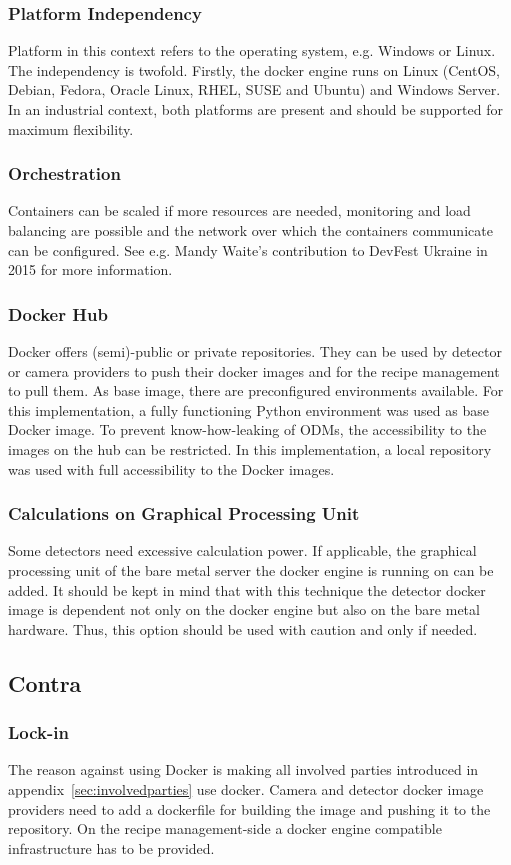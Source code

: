 \subsubsection{Platform Independency}
 Platform in this context refers to the operating system, e.g. Windows or Linux. The independency is twofold. Firstly, the docker engine runs on Linux (CentOS, Debian, Fedora, Oracle Linux, RHEL, SUSE and Ubuntu) and Windows Server. In an industrial context, both platforms are present and should be supported for maximum flexibility.
\subsubsection{Orchestration}
 Containers can be scaled if more resources are needed, monitoring and load balancing are possible and the network over which the containers communicate can be configured. See e.g. Mandy Waite's contribution to DevFest Ukraine in 2015 for more information.~\cite{Waite2015ScalableContainers}
\subsubsection{Docker Hub}
 Docker offers (semi)-public or private repositories. They can be used by detector or camera providers to push their docker images and for the recipe management to pull them. As base image, there are preconfigured environments available. For this implementation, a fully functioning Python environment was used as base Docker image. To prevent know-how-leaking of ODMs, the accessibility to the images on the hub can be restricted. In this implementation, a local repository was used with full accessibility to the Docker images.
 \subsubsection{Calculations on Graphical Processing Unit}
 Some detectors need excessive calculation power. If applicable, the graphical processing unit of the bare metal server the docker engine is running on can be added. It should be kept in mind that with this technique the detector docker image is dependent not only on the docker engine but also on the bare metal hardware. Thus, this option should be used with caution and only if needed.
\subsection{Contra}
\subsubsection{Lock-in}
The reason against using Docker is making all involved parties introduced in appendix~\ref{sec:involvedparties} use docker. Camera and detector docker image providers need to add a dockerfile for building the image and pushing it to the repository. On the recipe management-side a docker engine compatible infrastructure has to be provided. 


